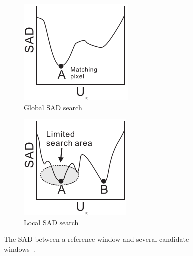 \begin{figure}
\begin{center}
	\begin{subfigure}{0.4\textwidth}
		\includegraphics[width=\textwidth]{figures/sadGlobalGraph.png}
		\caption{Global SAD search}
		\label{fig:globalSAD}
	\end{subfigure}
	\begin{subfigure}{0.4\textwidth}
		\includegraphics[width=\textwidth]{figures/sadLocalGraph.png}
		\caption{Local SAD search}
		\label{fig:localSAD}
	\end{subfigure}
	\captionfonts
	\caption{The SAD between a reference window and several candidate windows~\cite{sadParallel}.}
	\label{fig:sadGraphs}
\end{center}
\end{figure}

